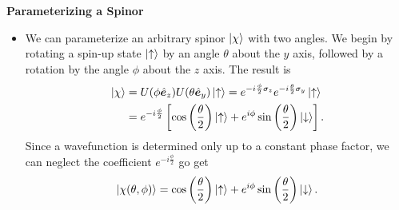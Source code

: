 \documentclass[11pt, a4paper]{article}
\renewcommand{\vec}[1]{\bm{#1}}  %
\newcommand{\uvec}[1]{\hat{\vec{#1}}}  %
\newcommand{\ua}{\uparrow}  %
\newcommand{\da}{\downarrow}  %
\begin{document}
\textbf{Parameterizing a Spinor}
\begin{itemize}
	\item We can parameterize an arbitrary spinor $ \ket{\chi} $ with two angles. We begin by rotating a spin-up state $ \ket{\ua} $ by an angle $ \theta $ about the $ y $ axis, followed by a rotation by the angle $ \phi $ about the $ z $ axis. The result is
	\begin{align*}
		\ket{\chi} &= U(\phi \uvec{e}_{z})U(\theta \uvec{e}_{y})\ket{\ua} = e^{-i\frac{\phi}{2}\sigma_{z}} e^{-i\frac{\theta}{2}\sigma_{y}}\ket{\ua}\\
		& = e^{-i\frac{\phi}{2}}\left[\cos \left(\frac{\theta}{2}\right)\ket{\ua} + e^{i \phi} \sin \left(\frac{\theta}{2}\right)\ket{\da}\right].
	\end{align*}
	Since a wavefunction is determined only up to a constant phase factor, we can neglect the coefficient $ e^{-i\frac{\phi}{2}} $ go get
	\begin{equation*}
		\ket{\chi(\theta, \phi)} = \cos \left(\frac{\theta}{2}\right)\ket{\ua} + e^{i \phi} \sin \left(\frac{\theta}{2}\right)\ket{\da}.
	\end{equation*}
	
\end{itemize}
\end{document}

